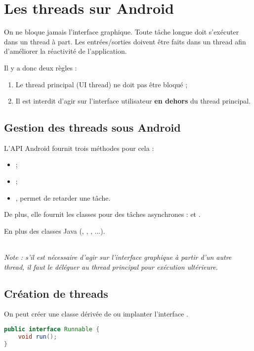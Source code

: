 \section{Les threads sur Android}
On ne bloque jamais l'interface graphique. Toute tâche longue doit s'exécuter dans un thread à part. Les entrées/sorties doivent être faits dans un thread afin d'améliorer la réactivité de l'application.

Il y a donc deux règles :
\begin{enumerate}
    \item Le thread principal (UI thread) ne doit pas être bloqué ;
    \item Il est interdit d’agir sur l’interface utilisateur \textbf{en dehors} du thread principal.
\end{enumerate}

\subsection{Gestion des threads sous Android}
L'API Android fournit trois méthodes pour cela :
\begin{itemize}
    \item {} ;
    \item {} ;
    \item {}, permet de retarder une tâche.
\end{itemize}

De plus, elle fournit les classes pour des tâches asynchrones :  et .

En plus des classes Java (, , , ...).

\noindent \\ \emph{Note : s’il est nécessaire d’agir sur l’interface graphique à partir d’un autre thread, il faut le déléguer au thread principal pour exécution ultérieure.}

\subsection{Création de threads}
On peut créer une classe dérivée de  ou implanter l'interface .
\begin{lstlisting}[language=java]
public interface Runnable {
    void run();
}
\end{lstlisting}

